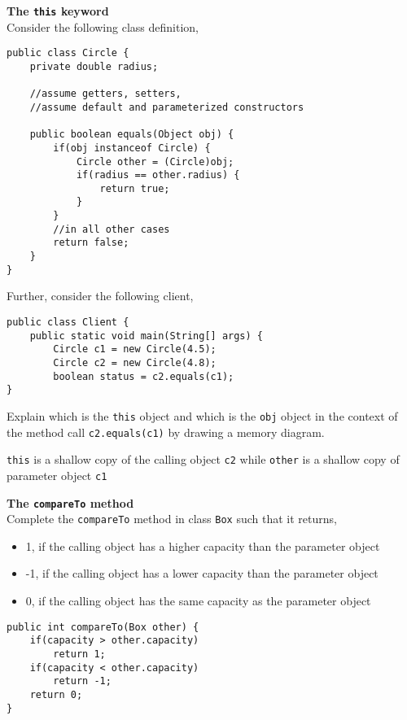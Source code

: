 \begin{questions}
\question \textbf{The \texttt{this} keyword}\\
Consider the following class definition,

\begin{lstlisting}
public class Circle {
	private double radius;
	
	//assume getters, setters, 
	//assume default and parameterized constructors
	
	public boolean equals(Object obj) {
		if(obj instanceof Circle) {
			Circle other = (Circle)obj;
			if(radius == other.radius) {
				return true;
			}
		}
		//in all other cases
		return false;
	}
}
\end{lstlisting}

Further, consider the following client,

\begin{lstlisting}
public class Client {
	public static void main(String[] args) {
		Circle c1 = new Circle(4.5);
		Circle c2 = new Circle(4.8);
		boolean status = c2.equals(c1);
}
\end{lstlisting}

Explain which is the \texttt{this} object and which is the \texttt{obj} object in the context of the method call \texttt{c2.equals(c1)} by drawing a memory diagram.

\begin{solution}
\texttt{this} is a shallow copy of the calling object \texttt{c2} while \texttt{other} is a shallow copy of parameter object \texttt{c1}
\end{solution}

\question \textbf{The \texttt{compareTo} method}\\
Complete the \texttt{compareTo} method in class \texttt{Box} such that it returns,

\begin{itemize}
\item 1, if the calling object has a higher capacity than the parameter object
\item -1, if the calling object has a lower capacity than the parameter object
\item 0, if the calling object has the same capacity as the parameter object
\end{itemize}

\begin{solution}
\begin{lstlisting}
public int compareTo(Box other) {
	if(capacity > other.capacity)
		return 1;
	if(capacity < other.capacity)
		return -1;
	return 0;
}
\end{lstlisting}
\end{solution}


\end{questions}

